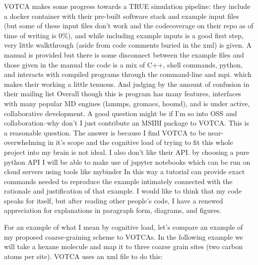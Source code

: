 VOTCA makes some progress towards a TRUE simulation pipeline: they include a docker container with their pre-built software stack and example input files  (but some of these input files don't work and the codecoverage on their repo as of time of writing is 0\%), and while including example inputs is a good first step, very little walkthrough (aside from code comments buried in the xml) is given\cite{votca-github}. %
A manual is provided but there is some disconnect between the example files and those given in the manual %
the code is a mix of C++, shell commands, python, and interacts with compiled programs through the command-line and mpi.
which makes their working a little tenuous.
And judging by the amount of confusion in their mailing list %
Overall though this is program has many features, interfaces with many popular MD engines (lammps, gromacs, hoomd), and is under active, collaborative development.
A good question might be if I'm so into OSS and collaboration--why don't I just contribute an MSIBI package to VOTCA.
This is a reasonable question.
The answer is because I find VOTCA to be near-overwhelming in it's scope and the cognitive load of trying to fit this whole project into my brain is not ideal.
I also don't like their API.
by choosing a pure python API I will be able to make use of jupyter notebooks which can be run on cloud servers using tools like mybinder %
In this way a tutorial can provide exact commands needed to reproduce the example intimately connected with the rationale and justification of that example.
I would like to think that my code speaks for itself, but after reading other people's code, I have a renewed appreciation for explanations in paragraph form, diagrams, and figures.

For an example of what I mean by cognitive load, let's compare an example of my proposed coarse-graining scheme to VOTCAs.
In the following example we will take a hexane molecule and map it to three coarse grain sites (two carbon atoms per site).
VOTCA uses an xml file to do this:



